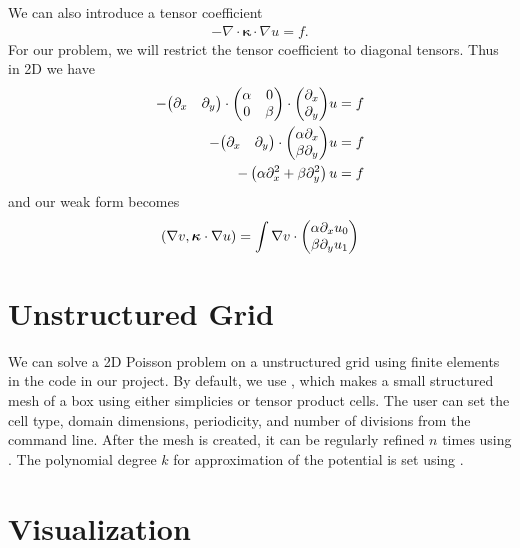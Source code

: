 We can also introduce a tensor coefficient
\begin{align}
  -\nabla \cdot \boldsymbol\kappa \cdot \nabla u = f.
\end{align}
For our problem, we will restrict the tensor coefficient to diagonal tensors. Thus in 2D we have
\begin{align}
  -\mqty(\partial_x & \partial_y) \cdot \mqty(\alpha & 0\\ 0 & \beta) \cdot \mqty(\partial_x \\ \partial_y) u &= f \\
  -\mqty(\partial_x & \partial_y) \cdot \mqty(\alpha\partial_x \\ \beta\partial_y) u &= f \\
  -\left(\alpha\partial^2_x + \beta\partial^2_y\right) u &= f
\end{align}
and our weak form becomes
\begin{align}
  \left(\nabla v, \boldsymbol\kappa \cdot \nabla u\right) = \int \nabla v \cdot \mqty(\alpha\partial_x u_0 \\ \beta\partial_y u_1)
\end{align}

\section{Unstructured Grid}

We can solve a 2D Poisson problem on a unstructured grid using finite elements in the  code in our project. By default, we use , which makes a small structured mesh of a box using either simplicies or tensor product cells. The user can set the cell type, domain dimensions, periodicity, and number of divisions from the command line. After the mesh is created, it can be regularly refined $n$ times using . The polynomial degree $k$ for approximation of the potential is set using .

\section{Visualization}


